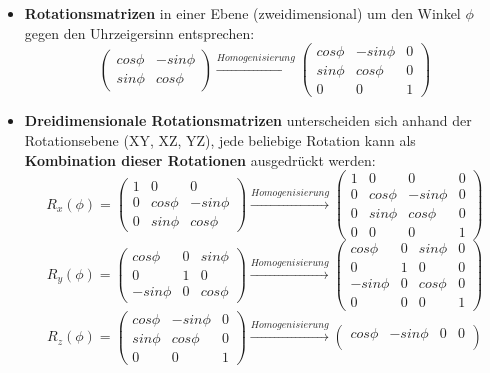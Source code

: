\begin{itemize}
	\item \textbf{Rotationsmatrizen} in einer Ebene (zweidimensional) um den Winkel $\phi$ gegen den Uhrzeigersinn entsprechen:
	$$\begin{pmatrix}
		cos\phi & -sin\phi\\
		sin\phi & cos\phi
	\end{pmatrix} \xrightarrow[]{Homogenisierung} \begin{pmatrix}
		cos\phi & -sin\phi & 0\\
		sin\phi & cos\phi & 0\\
		0 & 0 & 1
	\end{pmatrix}$$
	\newpage
	\item \textbf{Dreidimensionale Rotationsmatrizen} unterscheiden sich anhand der Rotationsebene (XY, XZ, YZ), jede beliebige Rotation kann als \textbf{Kombination dieser Rotationen} ausgedrückt werden:
	$$R_x(\phi) = \begin{pmatrix}
		1 & 0 & 0\\
		0 & cos\phi & -sin\phi\\
		0 & sin\phi & cos\phi
	\end{pmatrix} \xrightarrow[]{Homogenisierung} \begin{pmatrix}
		1 & 0 & 0 & 0\\
		0 & cos\phi & -sin\phi & 0\\
		0 & sin\phi & cos\phi & 0\\
		0 & 0 & 0 & 1
	\end{pmatrix}$$
	$$R_y(\phi) = \begin{pmatrix}
		cos\phi & 0 & sin\phi\\
		0 & 1 & 0\\
		-sin\phi & 0 & cos\phi
	\end{pmatrix} \xrightarrow[]{Homogenisierung} \begin{pmatrix}
		cos\phi & 0 & sin\phi & 0\\
		0 & 1 & 0 & 0\\
		-sin\phi & 0 & cos\phi & 0\\
		0 & 0 & 0 & 1
	\end{pmatrix}$$
	$$R_z(\phi) = \begin{pmatrix}
		cos\phi & -sin\phi & 0\\
		sin\phi & cos\phi & 0\\
		0 & 0 & 1
	\end{pmatrix} \xrightarrow[]{Homogenisierung} \begin{pmatrix}
		cos\phi & -sin\phi & 0 & 0\\

\end{pmatrix}$$
\end{itemize}
